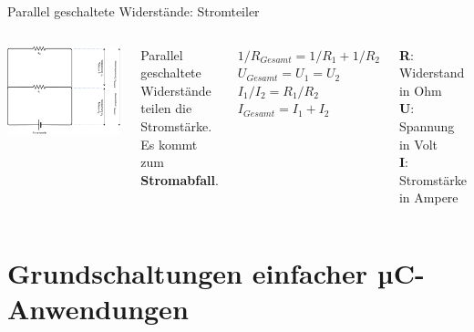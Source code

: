 {
\small

\begin{frame}{Parallel geschaltete Widerstände: Stromteiler}
    \begin{columns}
        \includegraphics[width=\textwidth]{2-hardwaredesign/img/stromteiler}

        Parallel geschaltete Widerstände teilen die Stromstärke.
        Es kommt zum \textbf{Stromabfall}.

        \bigskip
        \bigskip

        $1/R_{Gesamt} = 1/R_1 + 1/R_2$ \\
        \smallskip
        $U_{Gesamt} = U_1 = U_2$ \\
        \smallskip
        $I_1 / I_2 = R_1 / R_2$ \\
        \smallskip
        $I_{Gesamt} = I_1 + I_2$ \\

        \bigskip
        \bigskip

        \textbf{R}: Widerstand in Ohm \\
        \smallskip
        \textbf{U}: Spannung in Volt \\
        \smallskip
        \textbf{I}: Stromstärke in Ampere \\
    \end{columns}
\end{frame}
}


\section{Grundschaltungen einfacher µC-Anwendungen}

